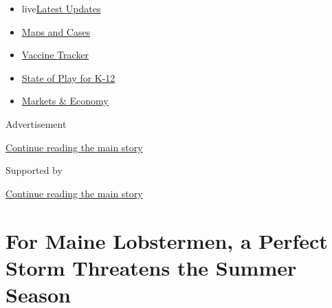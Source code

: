 \begin{itemize}
\tightlist
\item
  live\href{https://www.nytimes3xbfgragh.onion/2020/08/17/world/coronavirus-covid.html?name=styln-coronavirus-national\&region=TOP_BANNER\&variant=undefined\&block=storyline_menu_recirc\&action=click\&pgtype=Article\&impression_id=01a54ee1-e0fd-11ea-bcef-69dac116c31c}{Latest
  Updates}
\item
  \href{https://www.nytimes3xbfgragh.onion/interactive/2020/us/coronavirus-us-cases.html?name=styln-coronavirus-national\&region=TOP_BANNER\&variant=undefined\&block=storyline_menu_recirc\&action=click\&pgtype=Article\&impression_id=01a54ee2-e0fd-11ea-bcef-69dac116c31c}{Maps
  and Cases}
\item
  \href{https://www.nytimes3xbfgragh.onion/interactive/2020/science/coronavirus-vaccine-tracker.html?name=styln-coronavirus-national\&region=TOP_BANNER\&variant=undefined\&block=storyline_menu_recirc\&action=click\&pgtype=Article\&impression_id=01a54ee3-e0fd-11ea-bcef-69dac116c31c}{Vaccine
  Tracker}
\item
  \href{https://www.nytimes3xbfgragh.onion/2020/08/17/us/k-12-schools-reopening.html?name=styln-coronavirus-national\&region=TOP_BANNER\&variant=undefined\&block=storyline_menu_recirc\&action=click\&pgtype=Article\&impression_id=01a54ee4-e0fd-11ea-bcef-69dac116c31c}{State
  of Play for K-12}
\item
  \href{https://www.nytimes3xbfgragh.onion/live/2020/08/17/business/stock-market-today-coronavirus?name=styln-coronavirus-national\&region=TOP_BANNER\&variant=undefined\&block=storyline_menu_recirc\&action=click\&pgtype=Article\&impression_id=01a54ee5-e0fd-11ea-bcef-69dac116c31c}{Markets
  \& Economy}
\end{itemize}

Advertisement

\protect\hyperlink{after-top}{Continue reading the main story}

Supported by

\protect\hyperlink{after-sponsor}{Continue reading the main story}

\hypertarget{for-maine-lobstermen-a-perfect-storm-threatens-the-summer-season}{%
\section{For Maine Lobstermen, a Perfect Storm Threatens the Summer
Season}\label{for-maine-lobstermen-a-perfect-storm-threatens-the-summer-season}}

